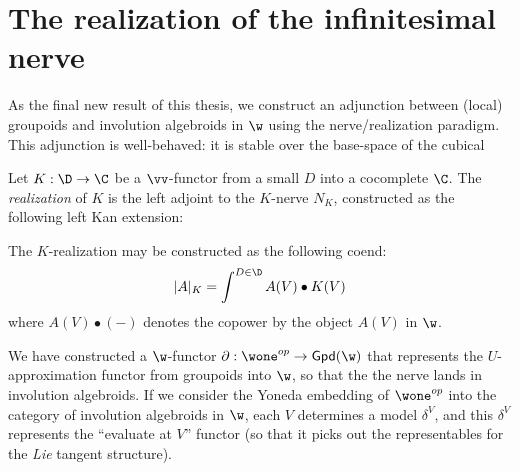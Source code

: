




\section{The realization of the infinitesimal nerve}%
\label{sec:realization-of-inf-nerve}

As the final new result of this thesis, we construct an adjunction between (local) groupoids and involution algebroids in $\w$ using the nerve/realization paradigm. This adjunction is well-behaved: it is stable over the base-space of the cubical 

\begin{definition}
	Let $K: \D \to \C$ be a $\vv$-functor from a small $D$ into a cocomplete $\C$.
	The \textit{realization} of $K$ is the left adjoint to the $K$-nerve $N_K$, constructed as the following left Kan extension:
    \[\]
\end{definition}
\begin{lemma}
	The $K$-realization may be constructed as the following coend:
	\[
		|A|_K = \int^{D \in \D} A(V) \bullet K(V)
	\]
	where $A(V) \bullet(-)$ denotes the copower by the object $A(V)$ in $\w$.
\end{lemma}
We have constructed a $\w$-functor $\partial: \wone^{op} \to \mathsf{Gpd}(\w)$ that represents the $U$-approximation functor from groupoids into $\w$, so that the the nerve lands in involution algebroids. If we consider the Yoneda embedding of $\wone^{op}$ into the category of involution algebroids in $\w$, each $V$ determines a model $\delta^V$, and this $\delta^V$ represents the ``evaluate at $V$'' functor (so that it picks out the representables for the \textit{Lie} tangent structure). 
\[\]

